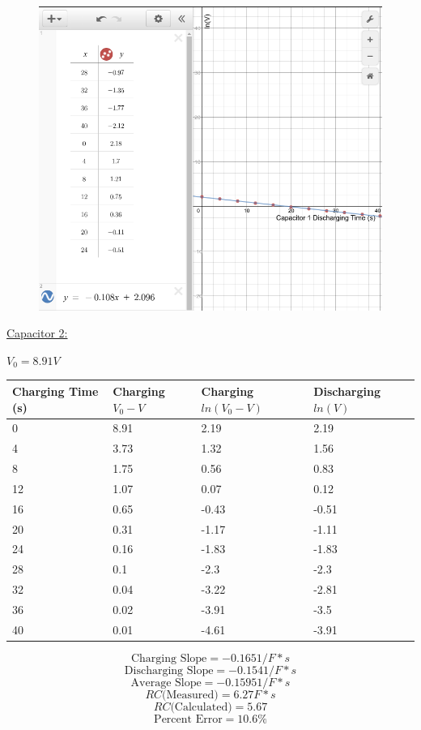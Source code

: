 \documentclass[11pt, titlepage]{article}
\begin{document}
\begin{figure}[h]
\centering
\hspace*{0cm}
\includegraphics[scale=0.6]{graph32.jpg}
\vspace*{0cm}
\end{figure}

\underline{Capacitor 2:}
\begin{center}
$V_0 = 8.91 V$
\begin{tabular}
{|m{6em}|m{6em}|m{6em}|m{6em}|}
\hline
Charging Time (s) & Charging $V_0 - V$ & Charging $ln(V_0 - V)$ & Discharging $ln(V)$ \\
\hline
0 & 8.91 & 2.19 & 2.19\\
\hline
4 & 3.73 & 1.32 & 1.56\\
\hline
8 & 1.75 & 0.56 & 0.83\\
\hline
12 & 1.07 & 0.07 & 0.12\\
\hline
16 & 0.65 & -0.43 & -0.51\\
\hline
20 & 0.31 & -1.17 & -1.11\\
\hline
24 & 0.16 & -1.83 & -1.83\\
\hline
28 & 0.1 & -2.3 & -2.3\\
\hline
32 & 0.04 & -3.22 & -2.81\\
\hline
36 & 0.02 & -3.91 & -3.5\\
\hline
40 & 0.01 & -4.61 & -3.91\\
\hline
\end{tabular}
$$\text{Charging Slope} = -0.165 1/F*s$$
$$\text{Discharging Slope} = -0.154 1/F*s$$
$$\text{Average Slope} = -0.1595 1/F*s$$
$$RC \text{(Measured)} = 6.27 F*s$$
$$RC \text{(Calculated)} = 5.67$$
$$\text{Percent Error} = 10.6\%$$
\end{center}
\end{document}
